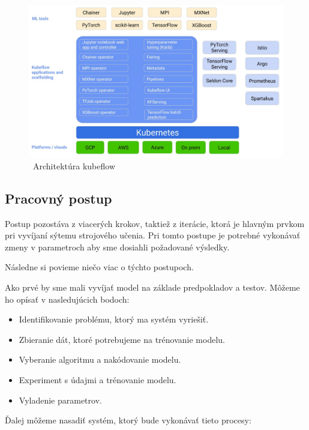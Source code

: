 \begin{figure}[!ht]
    \includegraphics[width=.9\textwidth]{figures/kubeflowaarch}
    \caption{\ Architektúra kubeflow \cite{web} \label{o:latex_friendly_zone}}
\end{figure}

\subsection{Pracovný postup}
Postup pozostáva z viacerých krokov, taktiež z iterácie, ktorá je hlavným prvkom pri vyvíjaní sýtemu strojového učenia. Pri tomto postupe je potrebné vykonávať zmeny v parametroch aby sme dosiahli požadované výsledky.

Následne si povieme niečo viac o týchto postupoch.

Ako prvé by sme mali vyvíjať model na základe predpokladov a testov. Môžeme ho opísať v nasledujúcich bodoch:\cite{web}

\begin{itemize}
    \item Identifikovanie problému, ktorý ma systém vyriešiť.
    \item Zbieranie dát, ktoré potrebujeme na trénovanie modelu.
    \item Vyberanie algoritmu a nakódovanie modelu.
    \item Experiment s údajmi a trénovanie modelu.
	\item Vyladenie parametrov.
\end{itemize}

Ďalej môžeme nasadiť systém, ktorý bude vykonávať tieto procesy:

